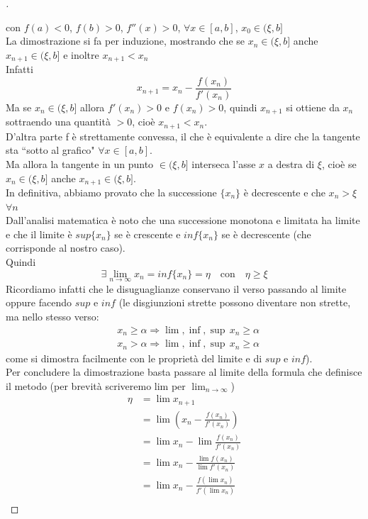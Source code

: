 \begin{proof}[\unskip\nopunct]
\begin{center}
\end{center}
con $f(a) < 0$, $f(b) > 0$, $f''(x) > 0$, $\forall x \in [a,b]$, $x_0 \in (\xi,b]$\\
La dimostrazione si fa per induzione, mostrando che se $x_n \in (\xi, b]$ anche $x_{n+1} \in (\xi, b]$ e inoltre $x_{n+1} < x_n$ \\
Infatti \[x_{n+1} = x_n - \frac{f(x_n)}{f'(x_n)}\]
Ma se $x_n \in (\xi, b]$ allora $f'(x_n) > 0$ e $f(x_n) > 0$, quindi $x_{n+1}$ si ottiene da $x_n$ sottraendo una quantità $> 0$, cioè $x_{n+1} < x_n$.\\
D'altra parte f è strettamente convessa, il che è equivalente a dire che la tangente sta ``sotto al grafico" $\forall x \in [a,b]$.\\ 
Ma allora la tangente in un punto $\in (\xi, b]$ interseca l'asse $x$ a destra di $\xi$, cioè se $x_n \in (\xi, b]$ anche $x_{n+1} \in (\xi, b]$.\\
In definitiva, abbiamo provato che la successione $\{x_n\}$ è decrescente e che $x_n > \xi$ $\forall n$\\
Dall'analisi matematica è noto che una successione monotona e limitata ha limite e che il limite è $sup\{x_n\}$ se è crescente e $inf\{x_n\}$ se è decrescente (che corrisponde al nostro caso). \\
Quindi 
\[\exists \lim_{n \to \infty} x_n = inf\{x_n\} = \eta \quad \text{con} \quad \eta \geq \xi\]
Ricordiamo infatti che le disuguaglianze conservano il verso passando al limite oppure facendo $sup$ e $inf$ (le disgiunzioni strette possono diventare non strette, ma nello stesso verso:
\[ \begin{split}
	& x_n \geq \alpha \Rightarrow \lim, \inf, \sup \,x_n \geq \alpha \\ 
	& x_n > \alpha \Rightarrow \lim, \inf, \sup \,x_n \geq \alpha
\end{split} \]
come si dimostra facilmente con le proprietà del limite e di $sup$ e $inf$).\\
Per concludere la dimostrazione basta passare al limite della formula che definisce il metodo (per brevità scriveremo lim per $ \lim_{n \to \infty} $)
\[ \begin{split}
	\eta & = \lim x_{n+1} \\
	& = \lim \left( x_n - \frac{f(x_n)}{f'(x_n)} \right) \\
	& = \lim x_n - \lim\frac{f(x_n)}{f'(x_n)} \\
	& = \lim x_n - \frac{\lim f(x_n)}{\lim f'(x_n)} \\ 
	& = \lim x_n - \frac{f(\lim x_n)}{f'(\lim x_n)} \\

\end{split}\]
\end{proof}
